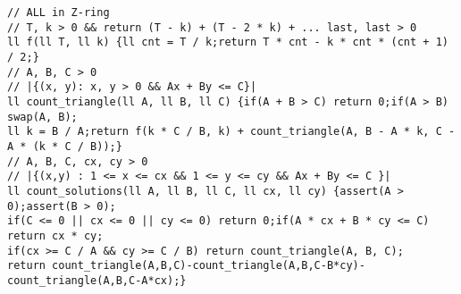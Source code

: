 \documentclass[a4paper,12pt]{article}
\begin{document}
\begin{verbatim}
// ALL in Z-ring
// T, k > 0 && return (T - k) + (T - 2 * k) + ... last, last > 0
ll f(ll T, ll k) {ll cnt = T / k;return T * cnt - k * cnt * (cnt + 1) / 2;}
// A, B, C > 0
// |{(x, y): x, y > 0 && Ax + By <= C}|
ll count_triangle(ll A, ll B, ll C) {if(A + B > C) return 0;if(A > B) swap(A, B);
ll k = B / A;return f(k * C / B, k) + count_triangle(A, B - A * k, C - A * (k * C / B));}
// A, B, C, cx, cy > 0
// |{(x,y) : 1 <= x <= cx && 1 <= y <= cy && Ax + By <= C }|
ll count_solutions(ll A, ll B, ll C, ll cx, ll cy) {assert(A > 0);assert(B > 0);
if(C <= 0 || cx <= 0 || cy <= 0) return 0;if(A * cx + B * cy <= C) return cx * cy;
if(cx >= C / A && cy >= C / B) return count_triangle(A, B, C);
return count_triangle(A,B,C)-count_triangle(A,B,C-B*cy)-count_triangle(A,B,C-A*cx);}
\end{verbatim}
\end{document}
